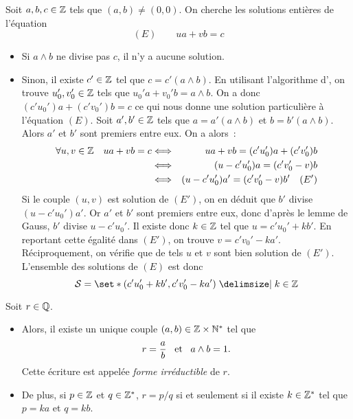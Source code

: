 \documentclass{magnolia}
\begin{document}
\begin{remarqueUnique}
\remarque Soit $a,b,c\in\mathbb{Z}$ tels que $(a,b)\neq (0,0)$. On cherche les
  solutions entières de l'équation
  \[(E) \qquad ua+vb=c\]
  \begin{itemize}
  \item Si $a\wedge b$ ne divise pas $c$, il n'y a aucune solution.
  \item Sinon, il existe $c'\in\mathbb{Z}$ tel que $c=c'(a\wedge b)$.
    En utilisant l'algorithme d', on trouve $u_0',v_0'\in\mathbb{Z}$ tels que
    $u_0' a+v_0' b=a\wedge b$. On a donc $(c'u_0')a+(c'v_0')b=c$ ce qui nous
    donne une solution particulière à l'équation $(E)$. Soit $a',b'\in\mathbb{Z}$ tels
    que $a=a'(a\wedge b)$ et $b=b'(a\wedge b)$. Alors $a'$ et $b'$ sont premiers
    entre eux. On a alors~:
    \begin{eqnarray*}
    \forall u,v\in\mathbb{Z} \quad ua+vb=c
    &\Longleftrightarrow& ua+vb=(c'u_0')a+(c'v_0')b\\
    &\Longleftrightarrow& (u-c'u_0')a=(c'v_0'-v)b\\
    &\Longleftrightarrow& (u-c'u_0')a'=(c'v_0'-v)b' \quad (E')
    \end{eqnarray*}
    Si le couple $(u,v)$ est solution de $(E')$, on en déduit que $b'$ divise
    $(u-c'u_0')a'$. Or $a'$ et $b'$ sont premiers entre eux, donc d'après le
    lemme de Gauss, $b'$ divise $u-c'u_0'$. Il existe donc $k\in\mathbb{Z}$ tel que
    $u=c'u_0'+kb'$. En reportant cette égalité dans $(E')$, on trouve
    $v=c'v_0'-ka'$. Réciproquement, on vérifie que de tels $u$ et $v$ sont
    bien solution de $(E')$. L'ensemble des solutions de $(E)$ est donc
    \[\mathcal{S}=\enstq{(c'u_0'+kb',c'v_0'-ka')}{k\in\Z}\]
  \end{itemize}
\end{remarqueUnique}


\begin{proposition}
Soit $r\in\mathbb{Q}$.
\begin{itemize}
\item Alors, il existe un unique couple $\left(a,b\right)\in\mathbb{Z}\times{\mathbb{N}^*}$ tel que
  \[r=\frac{a}{b} \quad\!\text{et}\quad\! a\wedge b=1.\]
  Cette écriture est appelée \emph{forme irréductible} de $r$.
\item De plus, si $p\in\mathbb{Z}$ et $q\in\mathbb{Z}^*$, $r=p/q$ si et seulement si il existe
  $k\in\mathbb{Z}^*$ tel que $p=ka$ et $q=kb$.
\end{itemize}
\end{proposition}
\end{document}
